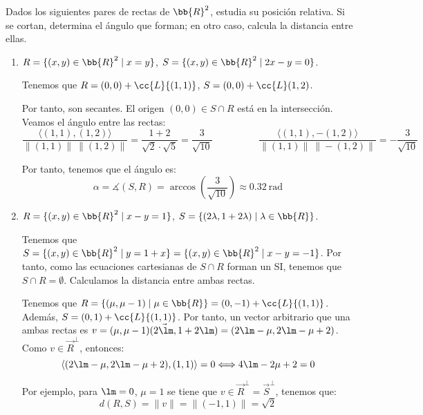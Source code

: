 \begin{ejercicio}
    Dados los siguientes pares de rectas de $\bb{R}^2$, estudia su posición relativa. Si se cortan, determina el ángulo que forman; en otro caso, calcula la distancia entre ellas.
    \begin{enumerate}
        \item $R=\{(x,y)\in \bb{R}^2 \mid x=y\}$, $S=\{(x,y)\in \bb{R}^2\mid 2x-y=0\}$.

        Tenemos que $R=(0,0)+\cc{L}\{(1,1)\}$, $S=(0,0)+\cc{L}(1,2)$. 

        Por tanto, son secantes. El origen $(0,0)\in S\cap R$ está en la intersección. Veamos el ángulo entre las rectas:
        \begin{equation*}
            \frac{\langle (1,1), (1,2)\rangle}{\|(1,1)\|~\|(1,2)\|} = \frac{1+2}{\sqrt{2}\cdot \sqrt{5}} = \frac{3}{\sqrt{10}}
            \hspace{2cm}
            \frac{\langle (1,1), -(1,2)\rangle}{\|(1,1)\|~\|-(1,2)\|} = -\frac{3}{\sqrt{10}}
        \end{equation*}

        Por tanto, tenemos que el ángulo es:
        \begin{equation*}
            \alpha = \measuredangle (S,R) = \arccos \left(\frac{3}{\sqrt{10}}\right) \approx 0.32~ \text{rad}
        \end{equation*}
        
        \item $R=\{(x,y)\in \bb{R}^2 \mid x-y=1\}$, $S=\{(2\lambda,1+2\lambda) \mid \lambda\in \bb{R}\}$.

        Tenemos que $S=\{(x,y)\in \bb{R}^2\mid y=1+x\}=\{(x,y)\in \bb{R}^2\mid x-y=-1\}$. Por tanto, como las ecuaciones cartesianas de $S\cap R$ forman un SI, tenemos que $S\cap R=\emptyset$. Calculamos la distancia entre ambas rectas.

        Tenemos que $R=\{(\mu, \mu-1)\mid \mu\in \bb{R}\}=(0,-1)+\cc{L}\{(1,1)\}$. Además, $S=(0,1)+\cc{L}\{(1,1)\}$. Por tanto, un vector arbitrario que una ambas rectas es $v=\vec{(\mu,\mu-1)(2\lm, 1+2\lm)}=(2\lm-\mu, 2\lm -\mu + 2)$. Como $v\in \vec{R}^\perp$, entonces:
        \begin{equation*}
            \langle (2\lm-\mu, 2\lm -\mu + 2), (1,1)\rangle = 0
            \Longleftrightarrow 4\lm -2\mu +2 = 0
        \end{equation*}

        Por ejemplo, para $\lm = 0$, $\mu=1$ se tiene que $v\in \vec{R}^\perp = \vec{S}^\perp$, tenemos que:
        \begin{equation*}
            d(R,S) = \|v\| = \|(-1, 1)\| = \sqrt{2}
        \end{equation*}
    \end{enumerate}
\end{ejercicio}

